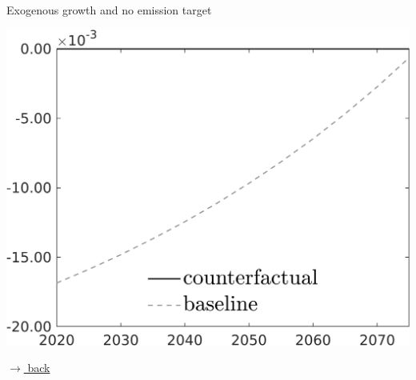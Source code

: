 \documentclass[11pt,aspectratio=169]{beamer}
\begin{document}
\begin{frame}{Exogenous growth and no emission target}
	\hypertarget{zerotaul}{}
	\centering 
	\begin{minipage}[]{0.4\textwidth}
		\includegraphics[width=1\textwidth]{../codding_model/own_basedOnFried/optimalPol_elastS_DisuSci/figures/all_1705/SingleROB_xgrowth_OPT_NOT_NoTaus_taul_spillover0_noskill0_sep1_BN0_ineq0_red0_etaa0.79_lgd1.png}
	\end{minipage}
	
	\vspace{1mm}
	\hfill
	\hyperlink{backrob}{\tiny{$\rightarrow$ back}}
\end{frame}
\end{document}
